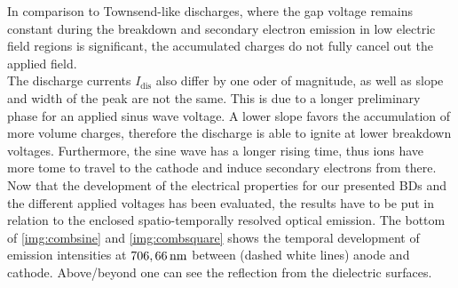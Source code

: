 \documentclass[a4paper,10pt,twoside]{article}
\newcommand{\ix}[1]{_\text{#1}}
\begin{document}
			In comparison to Townsend-like discharges, where the gap voltage remains constant during the breakdown and secondary electron emission in low electric field regions is significant, the accumulated charges do not fully cancel out the applied field.\\
			The discharge currents $I\ix{dis}$ also differ by one oder of magnitude, as well as slope and width of the peak are not the same. This is due to a longer preliminary phase for an applied sinus wave voltage. A lower slope favors the accumulation of more volume charges, therefore the discharge is able to ignite at lower breakdown voltages. Furthermore, the sine wave has a longer rising time, thus ions have more tome to travel to the cathode and induce secondary electrons from there.\\					
			Now that the development of the electrical properties for our presented BDs and the different applied voltages has been evaluated, the results have to be put in relation to the enclosed spatio-temporally resolved optical emission. The bottom of \autoref{img:combsine} and \autoref{img:combsquare} shows the temporal development of emission intensities at $\unit[706,66]{nm}$ between (dashed white lines) anode and cathode. Above/beyond one can see the reflection from the dielectric surfaces.
			
		\onecolumn
				
\end{document}
